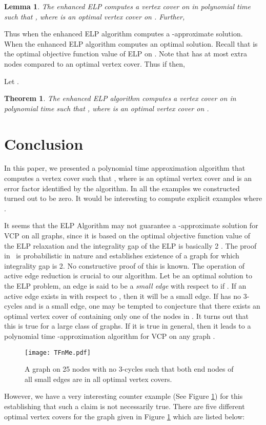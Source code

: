 \documentclass[12pt]{article}
\newtheorem{theorem}{Theorem}
\newtheorem{lemma}{Lemma}
\begin{document}
\begin{lemma} The enhanced ELP computes a vertex cover  on  in
polynomial time such that , where
 is an optimal vertex cover on . Further, \end{lemma}

Thus when  the enhanced ELP algorithm computes a
-approximate solution. When  the
enhanced ELP algorithm computes an optimal solution. Recall that
 is the optimal objective function value of ELP on . Note
that  has at most  extra nodes compared to an
optimal vertex cover. Thus if  then,

 Let .

 \begin{theorem} The enhanced ELP algorithm computes a vertex cover  on  in
polynomial time such that , where 
is an optimal vertex cover on .\end{theorem}


\section{Conclusion} In this paper, we presented a polynomial time
approximation algorithm that computes a vertex cover  such that
, where  is an optimal vertex
cover and  is an error factor identified by the algorithm. In
all the examples we constructed  turned out to be zero.
It would be interesting
to compute explicit examples where .

\vskip 5pt

It seems that the ELP Algorithm may not guarantee a -approximate solution for VCP on all graphs, since it is based on
the optimal objective function value of the ELP relaxation and the
integrality gap of the ELP is basically 2 \cite{arora}. The proof
in~\cite{arora} is probabilistic in nature and establishes existence
of a graph for which integrality gap is 2. No constructive proof of
this is known. The operation of active edge reduction is crucial to
our algorithm. Let  be an optimal solution to the ELP problem,
an edge  is said to be a {\it small edge} with respect to
 if . If
an active edge exists in  with respect to , then it will be
a small edge.
If  has no 3-cycles and  is a small edge, one may be tempted to
conjecture that
 there exists an optimal vertex cover  of  containing
only one of the nodes in . It turns out that this is true
for a large class of graphs. If it is true in general, then it leads
to a polynomial time -approximation algorithm  for VCP on
any graph .

\begin{figure}\begin{center}
\texttt{[image: TFnMe.pdf]}
  \caption{A graph  on 25 nodes with no 3-cycles such that both end nodes of all small edges
   are in all optimal vertex covers.}
  \label{fig2}
\end{center}\end{figure}
However, we have a very interesting counter example (See Figure
\ref{fig2}) for this establishing that such a claim is not
necessarily true. There are  five different optimal vertex covers
for the graph given in Figure \ref{fig2} which are listed below:
\end{document}
